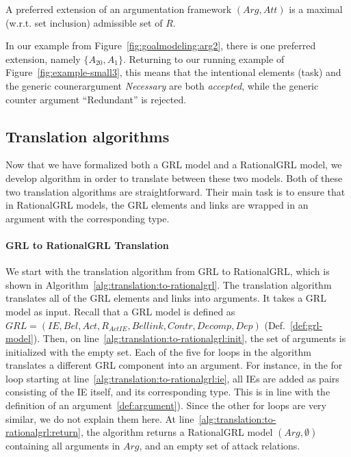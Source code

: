 \begin{definition} 
\label{def:preferred-semantics}
A preferred extension of an argumentation framework $(Arg,Att)$ is a maximal (w.r.t. set inclusion) admissible set of $R$.
\end{definition}

In our example from Figure~\ref{fig:goalmodeling:arg2}, there is one preferred extension, namely $\{A_{20},A_1\}$. Returning to our running example of Figure~\ref{fig:example-small3}, this means that the intentional elements  (task) and the generic counerargument \emph{Necessary} are both \emph{accepted}, while the generic counter argument ``Redundant'' is rejected.

\subsection{Translation algorithms}

Now that we have formalized both a GRL model and a RationalGRL model, we develop algorithm in order to translate between these two models. Both of these two translation algorithms are straightforward. Their main task is to ensure that in RationalGRL models, the GRL elements and links are wrapped in an argument with the corresponding type.

\paragraph{GRL to RationalGRL Translation} We start with the translation algorithm from GRL to RationalGRL, which is shown in Algorithm~\ref{alg:translation:to-rationalgrl}.  The translation algorithm translates all of the GRL elements and links into arguments. It takes a GRL model as input. Recall that a GRL model is defined as $GRL=(IE, Bel, Act, R_{ActIE}, Bellink, Contr, Decomp, Dep)$ (Def.~\ref{def:grl-model}). Then, on line~\ref{alg:translation:to-rationalgrl:init}, the set of arguments is initialized with the empty set. Each of the five for loops in the algorithm translates a different GRL component into an argument. For instance, in the for loop starting at line~\ref{alg:translation:to-rationalgrl:ie}, all IEs are added as pairs consisting of the IE itself, and its corresponding type. This is in line with the definition of an argument~\ref{def:argument}). Since the other for loops are very similar, we do not explain them here. At line~\ref{alg:translation:to-rationalgrl:return}, the algorithm returns a RationalGRL model $(Arg,\emptyset)$ containing all arguments in $Arg$, and an empty set of attack relations. 

